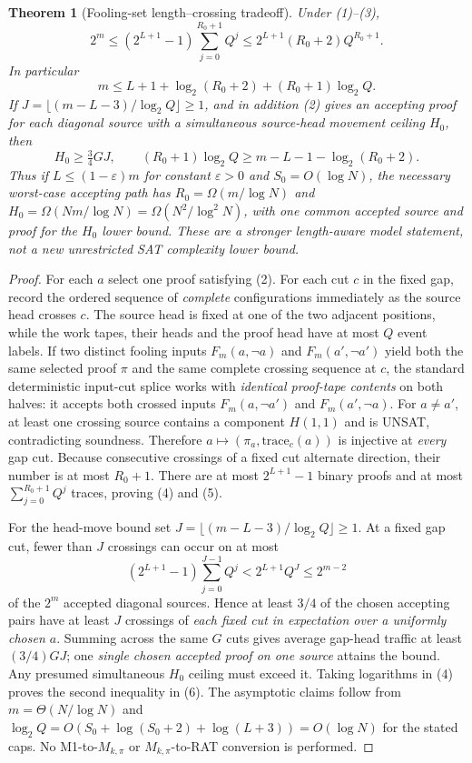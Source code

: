 \documentclass[11pt]{article}
\newtheorem{theorem}{Theorem}
\begin{document}
\begin{theorem}[Fooling-set length--crossing tradeoff]\label{th:cap}
Under (1)--(3),
\[
\boxed{2^m\le(2^{L+1}-1)\sum_{j=0}^{R_0+1}Q^j
\le 2^{L+1}(R_0+2)Q^{R_0+1}.}\tag{4}
\]
In particular
\[
m\le L+1+\log_2(R_0+2)+(R_0+1)\log_2Q.\tag{5}
\]
If $J=\lfloor(m-L-3)/\log_2Q\rfloor\ge1$, and in addition (2) gives an accepting proof for each diagonal source with a simultaneous source-head movement ceiling $H_0$, then
\[
\boxed{H_0\ge\tfrac34 GJ,\qquad
(R_0+1)\log_2Q\ge m-L-1-\log_2(R_0+2).}\tag{6}
\]
Thus if $L\le(1-\varepsilon)m$ for constant $\varepsilon>0$ and $S_0=O(\log N)$, the necessary worst-case accepting path has $R_0=\Omega(m/\log N)$ and $H_0=\Omega(Nm/\log N)=\Omega(N^2/\log^2N)$, with one common accepted source and proof for the $H_0$ lower bound. These are a stronger \emph{length-aware model statement}, not a new unrestricted SAT complexity lower bound.
\end{theorem}
\begin{proof}
For each $a$ select one proof satisfying (2). For each cut $c$ in the fixed gap, record the ordered sequence of \emph{complete} configurations immediately as the source head crosses $c$. The source head is fixed at one of the two adjacent positions, while the work tapes, their heads and the proof head have at most $Q$ event labels. If two distinct fooling inputs $F_m(a,\neg a)$ and $F_m(a',\neg a')$ yield both the same selected proof $\pi$ and the same complete crossing sequence at $c$, the standard deterministic input-cut splice works with \emph{identical proof-tape contents} on both halves: it accepts both crossed inputs $F_m(a,\neg a')$ and $F_m(a',\neg a)$. For $a\ne a'$, at least one crossing source contains a component $H(1,1)$ and is UNSAT, contradicting soundness. Therefore $a\mapsto(\pi_a,\mathrm{trace}_c(a))$ is injective at \emph{every} gap cut. Because consecutive crossings of a fixed cut alternate direction, their number is at most $R_0+1$. There are at most $2^{L+1}-1$ binary proofs and at most $\sum_{j=0}^{R_0+1}Q^j$ traces, proving (4) and (5).

For the head-move bound set $J=\lfloor(m-L-3)/\log_2Q\rfloor\ge1$. At a fixed gap cut, fewer than $J$ crossings can occur on at most
\[
(2^{L+1}-1)\sum_{j=0}^{J-1}Q^j
< 2^{L+1}Q^J\le 2^{m-2}
\]
of the $2^m$ accepted diagonal sources. Hence at least $3/4$ of the chosen accepting pairs have at least $J$ crossings of \emph{each fixed cut in expectation over a uniformly chosen $a$}. Summing across the same $G$ cuts gives average gap-head traffic at least $(3/4)GJ$; one \emph{single chosen accepted proof on one source} attains the bound. Any presumed simultaneous $H_0$ ceiling must exceed it. Taking logarithms in (4) proves the second inequality in (6). The asymptotic claims follow from $m=\Theta(N/\log N)$ and $\log_2Q=O(S_0+\log(S_0+2)+\log(L+3))=O(\log N)$ for the stated caps. No M1-to-$M_{k,\pi}$ or $M_{k,\pi}$-to-RAT conversion is performed.\end{proof}
\end{document}

